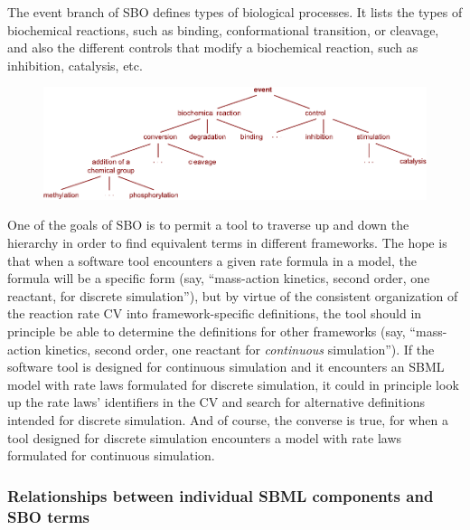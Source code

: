 \begin{blockChanged}

The event branch of SBO defines types of biological processes.  It
lists the types of biochemical reactions, such as binding,
conformational transition, or cleavage, and also the different
controls that modify a biochemical reaction, such as inhibition,
catalysis, etc.

\begin{figure}[tbh]
  \centering
  \includegraphics[scale = 0.97]{figs/sbo-event}
  \caption{}
  \label{fig:sbo-event}
\end{figure}

\end{blockChanged}

One of the goals of SBO is to permit a tool to traverse up and
down the hierarchy in order to find equivalent terms in different
frameworks.  The hope is that when a software tool encounters a
given rate formula in a model, the formula will be a specific form
(say, ``mass-action kinetics, second order, one reactant, for
discrete simulation''), but by virtue of the consistent
organization of the reaction rate CV into framework-specific
definitions, the tool should in principle be able to determine the
definitions for other frameworks (say, ``mass-action kinetics,
second order, one reactant for \emph{continuous} simulation'').
If the software tool is designed for continuous simulation and it
encounters an SBML model with rate laws formulated for discrete
simulation, it could in principle look up the rate laws'
identifiers in the CV and search for alternative definitions
intended for discrete simulation.  And of course, the converse is
true, for when a tool designed for discrete simulation encounters
a model with rate laws formulated for continuous simulation.

\subsubsection{Relationships between individual SBML components and SBO terms}

